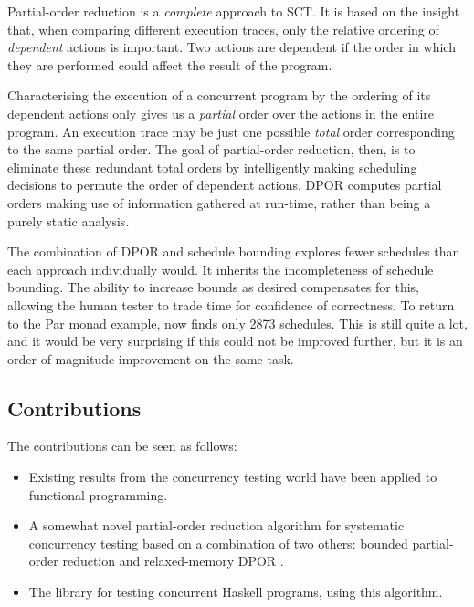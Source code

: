 Partial-order reduction \citep{por} is a \emph{complete} approach to
SCT. It is based on the insight that, when comparing different
execution traces, only the relative ordering of \emph{dependent}
actions is important. Two actions are dependent if the order in which
they are performed could affect the result of the program.

Characterising the execution of a concurrent program by the ordering
of its dependent actions only gives us a \emph{partial} order over the
actions in the entire program. An execution trace may be just one
possible \emph{total} order corresponding to the same partial
order. The goal of partial-order reduction, then, is to eliminate
these redundant total orders by intelligently making scheduling
decisions to permute the order of dependent actions. DPOR \citep{dpor}
computes partial orders making use of information gathered at
run-time, rather than being a purely static analysis.

The combination of DPOR and schedule bounding explores fewer schedules
than each approach individually would. It inherits the incompleteness
of schedule bounding. The ability to increase bounds as desired
compensates for this, allowing the human tester to trade time for
confidence of correctness. To return to the Par monad example,
\dejafu{} now finds only 2873 schedules. This is still quite a lot,
and it would be very surprising if this could not be improved further,
but it is an order of magnitude improvement on the same task.

\subsection{Contributions}
\label{sec:progress-dejafu-contribs}

The contributions can be seen as follows:

\begin{itemize}
\item Existing results from the concurrency testing world have been
  applied to functional programming.

\item A somewhat novel partial-order reduction algorithm for
  systematic concurrency testing based on a combination of two others:
  bounded partial-order reduction \citep{bpor} and relaxed-memory DPOR
  \citep{rdpor}.

\item The \dejafu{} library for testing concurrent Haskell programs,
  using this algorithm.
\end{itemize}
